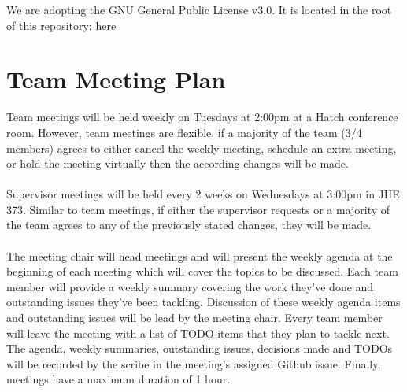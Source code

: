 \documentclass{article}
\begin{document}

We are adopting the GNU General Public License v3.0. It is located 
in the root of this repository: \href{https://github.com/Nicholas-Fabugais-Inaba/Sandlot/blob/main/LICENSE}{here}

\section{Team Meeting Plan}






Team meetings will be held weekly on Tuesdays at 2:00pm at a Hatch conference 
room. However, team meetings are flexible, if a majority of the team (3/4 members) 
agrees to either cancel the weekly meeting, schedule an extra meeting, or hold 
the meeting virtually then the according changes will be made.
\\
\\
\indent Supervisor meetings will be held every 2 weeks on Wednesdays at 3:00pm in JHE 373. Similar to team meetings, if either the supervisor requests 
or a majority of the team agrees to any of the previously stated changes, 
they will be made.
\\
\\
\indent The meeting chair will head meetings and will present the weekly agenda at 
the beginning of each meeting which will cover the topics to be discussed. 
Each team member will provide a weekly summary covering the work they've 
done and outstanding issues they've been tackling. Discussion of these 
weekly agenda items and outstanding issues will be lead by the meeting 
chair. Every team member will leave the meeting with a list of TODO items 
that they plan to tackle next. The agenda, weekly summaries, outstanding 
issues, decisions made and TODOs will be recorded by the scribe in the 
meeting's assigned Github issue. Finally, meetings have a maximum duration of
1 hour.
\end{document}
